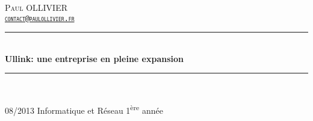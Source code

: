 \newcommand{\HRule}{\rule{\linewidth}{0.5mm}}
\begin{titlepage}
\begin{center}


\hfill\textsc{\LARGE{Paul OLLIVIER}\\
\hfill\href{mailto:contact@paulollivier.fr}{\texttt{contact@paulollivier.fr}}}

\vfill

\HRule \\[0.4cm]
{ \huge \bfseries Ullink: une entreprise en pleine expansion\\[0.4cm] }

\HRule \\[1.5cm]
\vfill

{\large 08/2013 \hfill Informatique et Réseau 1\textsuperscript{ère} année}

\end{center}
\end{titlepage}
